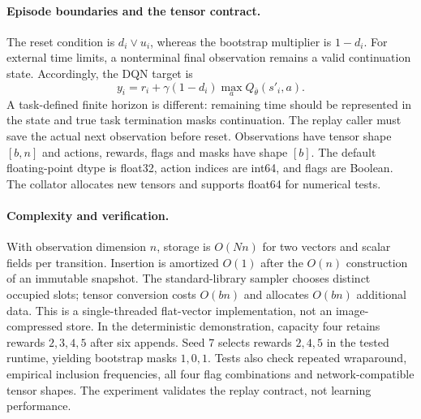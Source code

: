 \documentclass[11pt,a4paper]{article}
\begin{document}
\paragraph{Episode boundaries and the tensor contract.} The reset condition is $d_i\lor u_i$, whereas the bootstrap multiplier is $1-d_i$. For external time limits, a nonterminal final observation remains a valid continuation state. Accordingly, the DQN target is
\[
 y_i=r_i+\gamma(1-d_i)\max_a Q_{\bar\theta}(s'_i,a).
\]
A task-defined finite horizon is different: remaining time should be represented in the state and true task termination masks continuation. The replay caller must save the actual next observation before reset. Observations have tensor shape $[b,n]$ and actions, rewards, flags and masks have shape $[b]$. The default floating-point dtype is float32, action indices are int64, and flags are Boolean. The collator allocates new tensors and supports float64 for numerical tests.

\paragraph{Complexity and verification.} With observation dimension $n$, storage is $O(Nn)$ for two vectors and scalar fields per transition. Insertion is amortized $O(1)$ after the $O(n)$ construction of an immutable snapshot. The standard-library sampler chooses distinct occupied slots; tensor conversion costs $O(bn)$ and allocates $O(bn)$ additional data. This is a single-threaded flat-vector implementation, not an image-compressed store. In the deterministic demonstration, capacity four retains rewards $2,3,4,5$ after six appends. Seed 7 selects rewards $2,4,5$ in the tested runtime, yielding bootstrap masks $1,0,1$. Tests also check repeated wraparound, empirical inclusion frequencies, all four flag combinations and network-compatible tensor shapes. The experiment validates the replay contract, not learning performance.
\end{document}
